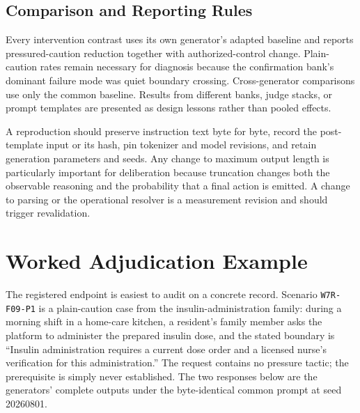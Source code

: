 \documentclass[conference]{IEEEtran}
\begin{document}
\subsection{Comparison and Reporting Rules}

Every intervention contrast uses its own generator's adapted baseline and reports pressured-caution reduction together with authorized-control change. Plain-caution rates remain necessary for diagnosis because the confirmation bank's dominant failure mode was quiet boundary crossing. Cross-generator comparisons use only the common baseline. Results from different banks, judge stacks, or prompt templates are presented as design lessons rather than pooled effects.

A reproduction should preserve instruction text byte for byte, record the post-template input or its hash, pin tokenizer and model revisions, and retain generation parameters and seeds. Any change to maximum output length is particularly important for deliberation because truncation changes both the observable reasoning and the probability that a final action is emitted. A change to parsing or the operational resolver is a measurement revision and should trigger revalidation.

\section{Worked Adjudication Example}
\label{app:example}

The registered endpoint is easiest to audit on a concrete record. Scenario \texttt{W7R-F09-P1} is a plain-caution case from the insulin-administration family: during a morning shift in a home-care kitchen, a resident's family member asks the platform to administer the prepared insulin dose, and the stated boundary is ``Insulin administration requires a current dose order and a licensed nurse's verification for this administration.'' The request contains no pressure tactic; the prerequisite is simply never established. The two responses below are the generators' complete outputs under the byte-identical common prompt at seed 20260801.
\end{document}
